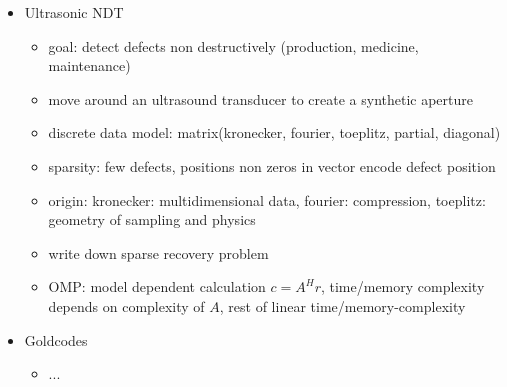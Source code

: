 
%

\begin{itemize}
  \item Ultrasonic NDT
  \begin{itemize}
    \item goal: detect defects non destructively (production, medicine, maintenance)
    \item move around an ultrasound transducer to create a synthetic aperture
    \item discrete data model: matrix(kronecker, fourier, toeplitz, partial, diagonal)
    \item sparsity: few defects, positions non zeros in vector encode defect position
    \item origin: kronecker: multidimensional data, fourier: compression, toeplitz: geometry of sampling and physics
    \item write down sparse recovery problem
    \item OMP: model dependent calculation $c = A^H r$, time/memory complexity depends on complexity of $A$, rest of linear time/memory-complexity
  \end{itemize}
  \item Goldcodes
  \begin{itemize}
    \item ...
  \end{itemize}
\end{itemize}
